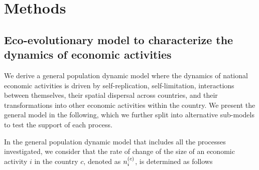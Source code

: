 
\section{Methods}\label{sec:methods_econobio}
\subsection{Eco-evolutionary model to characterize the dynamics of economic activities}

We derive a general population dynamic model where the dynamics of national economic activities is driven by self-replication, self-limitation, interactions between themselves, their spatial dispersal across countries, and their transformations into other economic activities within the country. We present the general model in the following, which we further split into alternative sub-models to test the support of each process.

In the general population dynamic model that includes all the processes investigated, we consider that the rate of change of the size of an economic activity $i$ in the country $c$, denoted as $n_i^{(c)} $, is determined as follows


